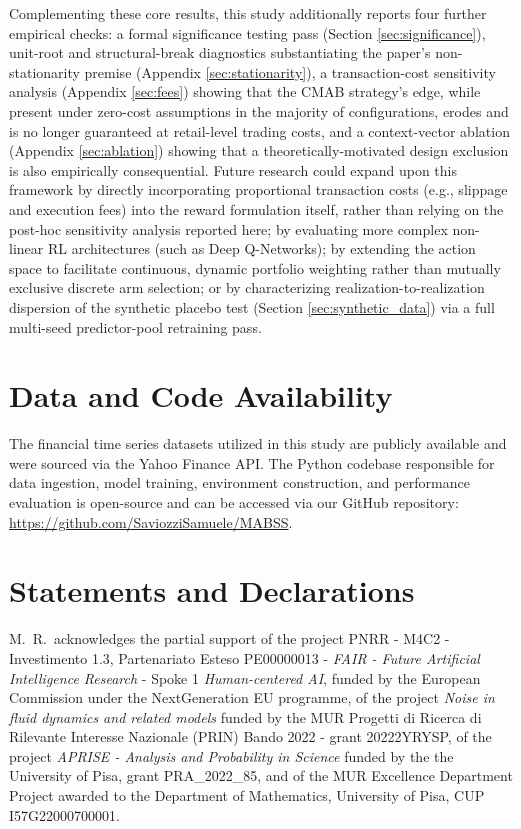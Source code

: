 \documentclass[pdflatex,sn-mathphys-num]{sn-jnl}
\theoremstyle{thmstyleone}%
\theoremstyle{thmstyletwo}%
\theoremstyle{thmstylethree}%
\begin{document}
Complementing these core results, this study additionally reports four further empirical checks: a formal significance testing pass (Section \ref{sec:significance}), unit-root and structural-break diagnostics substantiating the paper's non-stationarity premise (Appendix \ref{sec:stationarity}), a transaction-cost sensitivity analysis (Appendix \ref{sec:fees}) showing that the CMAB strategy's edge, while present under zero-cost assumptions in the majority of configurations, erodes and is no longer guaranteed at retail-level trading costs, and a context-vector ablation (Appendix \ref{sec:ablation}) showing that a theoretically-motivated design exclusion is also empirically consequential. Future research could expand upon this framework by directly incorporating proportional transaction costs (e.g., slippage and execution fees) into the reward formulation itself, rather than relying on the post-hoc sensitivity analysis reported here; by evaluating more complex non-linear RL architectures (such as Deep Q-Networks); by extending the action space to facilitate continuous, dynamic portfolio weighting rather than mutually exclusive discrete arm selection; or by characterizing realization-to-realization dispersion of the synthetic placebo test (Section \ref{sec:synthetic_data}) via a full multi-seed predictor-pool retraining pass.

\section*{Data and Code Availability}
The financial time series datasets utilized in this study are publicly available and were sourced via the Yahoo Finance API. The Python codebase responsible for data ingestion, model training, environment construction, and performance evaluation is open-source and can be accessed via our GitHub repository: \url{https://github.com/SaviozziSamuele/MABSS}.



\section*{Statements and Declarations}

M.~R.~acknowledges the partial support of the project PNRR - M4C2 - Investimento 1.3, Partenariato Esteso PE00000013 - \emph{FAIR - Future Artificial Intelligence Research} - Spoke 1 \emph{Human-centered AI}, funded by the European Commission under the NextGeneration EU programme, of the project \emph{Noise in fluid dynamics and related models} funded by the MUR Progetti di Ricerca di Rilevante Interesse Nazionale (PRIN) Bando 2022 - grant 20222YRYSP, of the project \emph{APRISE - Analysis and Probability in Science} funded by the the University of Pisa, grant PRA\_2022\_85, and of the MUR Excellence Department Project awarded to the Department of Mathematics, University of Pisa, CUP I57G22000700001.
\end{document}
